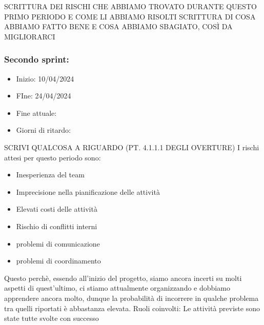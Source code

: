 \documentclass[italian,12pt]{article} %
\begin{document}
        SCRITTURA DEI RISCHI CHE ABBIAMO TROVATO DURANTE QUESTO PRIMO PERIODO E COME LI ABBIAMO RISOLTI
        SCRITTURA DI COSA ABBIAMO FATTO BENE E COSA ABBIAMO SBAGIATO, COSÌ DA MIGLIORARCI

    \subsubsection{Secondo sprint:}
    \begin{itemize}
        \item Inizio: 10/04/2024
        \item FIne: 24/04/2024
        \item Fine attuale:
        \item Giorni di ritardo:
    \end{itemize}
    SCRIVI QUALCOSA A RIGUARDO (PT. 4.1.1.1 DEGLI OVERTURE)
    I rischi attesi per questo periodo sono:
    \begin{itemize}
        \item Inesperienza del team
        \item Imprecisione nella pianificazione delle attività
        \item Elevati costi delle attività
        \item Rischio di conflitti interni 
        \item problemi di comunicazione
        \item problemi di coordinamento
    \end{itemize}
    Questo perchè, essendo all’inizio del progetto, siamo ancora incerti su molti aspetti di quest’ultimo, ci stiamo attualmente organizzando e dobbiamo apprendere ancora molto, dunque la probabilità di incorrere in qualche problema tra quelli riportati è abbastanza elevata.
    Ruoli coinvolti: 
    Le attività previste sono state tutte svolte con successo
\end{document}
